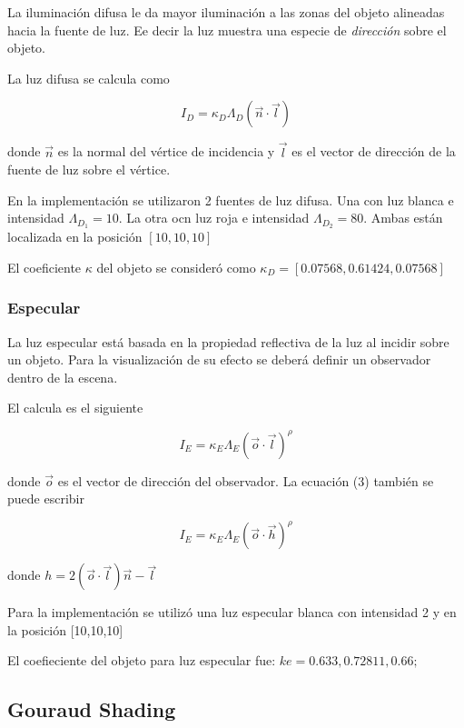 \documentclass[12pt]{article}
\begin{document}
La iluminación difusa le da mayor iluminación a las zonas del objeto alineadas hacia la fuente de luz. Ee decir la luz muestra una especie de \textit{dirección} sobre el objeto.

La luz difusa se calcula como 

\begin{equation}
I_{D}=\kappa_{D}\Lambda_{D}(\vec{n} \cdot \vec{l})
\end{equation}

donde $\vec{n}$ es la normal del vértice de incidencia y $\vec{l}$ es el vector de dirección de la fuente de luz sobre el vértice.

En la implementación se utilizaron 2 fuentes de luz difusa. Una con luz blanca e intensidad $\Lambda_{D_{1}}=10$. La otra ocn luz roja e intensidad $\Lambda_{D_{2}}=80$. Ambas están localizada en la posición $[10,10,10]$

El coeficiente $\kappa$ del objeto se consideró como $\kappa_{D}=[0.07568, 0.61424,0.07568]$

\subsubsection{Especular}

La luz especular está basada en la propiedad reflectiva de la luz al incidir sobre un objeto. Para la visualización de su efecto se deberá definir un observador dentro de la escena.

El calcula es el siguiente

\begin{equation} \label{eq:3}
I_{E}=\kappa_{E}\Lambda_{E}(\vec{o} \cdot \vec{l})^{\rho}
\end{equation}

donde $\vec{o}$ es el vector de dirección del observador. La ecuación (3) también se puede escribir

\begin{equation}
I_{E}=\kappa_{E}\Lambda_{E}(\vec{o} \cdot \vec{h})^{\rho}
\end{equation}


donde $h=2(\vec{o} \cdot \vec{l})\vec{n}-\vec{l}$

Para la implementación se utilizó una luz especular blanca con intensidad 2 y en la posición [10,10,10]
 
El coefieciente del objeto para luz especular fue: $ke={0.633, 0.72811,0.66};$

\subsection{Gouraud Shading}
\end{document}

